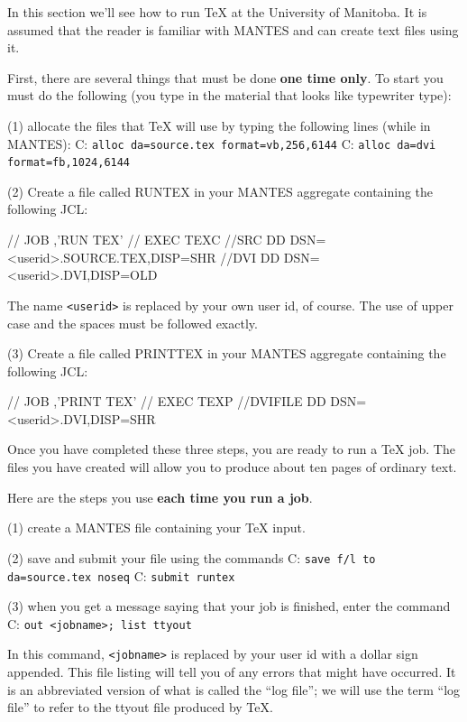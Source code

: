 In this section we'll see how to run \TeX{} at the University of 
Manitoba.  It is assumed that the reader is familiar with MANTES 
and can create text files using it. 

First, there are several things that must be done {\bf one time 
only}. To start you must do the following (you type in the 
material that looks like typewriter type): 
\beginlist
\beginlist
\item{(1)} allocate the files that \TeX{} will use by typing the 
\endlist
following lines (while in MANTES): 
\beginlist
\itemitem{}  C: {\tt alloc da=source.tex format=vb,256,6144} 
\itemitem{}  C: {\tt alloc da=dvi format=fb,1024,6144} 
\endlist
\endlist

\beginlist
\beginlist
\item{(2)} Create a file called RUNTEX in your MANTES aggregate 
\endlist
containing the following JCL:
\endlist 

\beginuser 
//        JOB  ,'RUN TEX' 
//        EXEC TEXC 
//SRC     DD DSN=<userid>.SOURCE.TEX,DISP=SHR 
//DVI     DD DSN=<userid>.DVI,DISP=OLD 
\enduser 


The name {\tt <userid>} is replaced by your own user id, of 
course. The use of upper case and the spaces must be followed 
exactly. 

\beginlist
\beginlist
\item{(3)} Create a file called PRINTTEX in your MANTES aggregate 
\endlist
containing the following JCL:
\endlist 

\beginuser 
//        JOB  ,'PRINT TEX' 
//        EXEC TEXP 
//DVIFILE DD DSN=<userid>.DVI,DISP=SHR 
\enduser 


Once you have completed these three steps, you are ready to run a 
\TeX{} job. The files you have created will allow you to produce 
about ten pages of ordinary text. 

Here are the steps you use {\bf each time you run a job}. 

\beginlist
\beginlist
\item{(1)} create a MANTES file containing your \TeX{} input. 
\item{(2)} save and submit your file using the commands 
\itemitem{} C: {\tt save f/l to da=source.tex noseq} 
\itemitem{} C: {\tt submit runtex} 
\item{(3)} when you get a message saying that your job is finished, 
\endlist
enter the command 
\beginlist
\itemitem{} C: {\tt out <jobname>; list ttyout} 
\endlist

In this command, {\tt <jobname>} is replaced by your user id with 
a dollar sign appended.  This file listing will tell you of any 
errors that might have occurred.  It is an abbreviated version of 
what is called the ``log file''; we will use the term ``log 
file'' to refer to the ttyout file produced by \TeX\null. 

